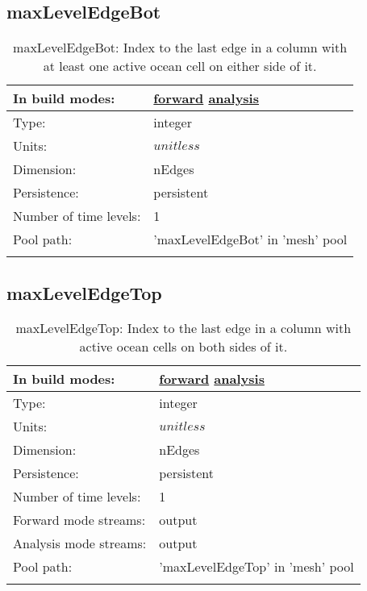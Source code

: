 \subsection[maxLevelEdgeBot]{maxLevelEdgeBot}
\label{subsec:var_sec_mesh_maxLevelEdgeBot}
\begin{center}
\begin{longtable}{| p{2.0in} | p{4.0in} |}
        \hline 
        In build modes: & \hyperref[subsec:forward_var_tab_mesh]{forward} \hyperref[subsec:analysis_var_tab_mesh]{analysis} \\
        \hline 
        Type: & integer \\
        \hline 
        Units: & $unitless$ \\
        \hline 
        Dimension: & nEdges \\
        \hline 
        Persistence: & persistent \\
        \hline 
        Number of time levels: & 1 \\
        \hline 
            Pool path: & 'maxLevelEdgeBot' in 'mesh' pool
 \\
		 \hline 
    \caption{maxLevelEdgeBot: Index to the last edge in a column with at least one active ocean cell on either side of it.}
\end{longtable}
\end{center}
\subsection[maxLevelEdgeTop]{maxLevelEdgeTop}
\label{subsec:var_sec_mesh_maxLevelEdgeTop}
\begin{center}
\begin{longtable}{| p{2.0in} | p{4.0in} |}
        \hline 
        In build modes: & \hyperref[subsec:forward_var_tab_mesh]{forward} \hyperref[subsec:analysis_var_tab_mesh]{analysis} \\
        \hline 
        Type: & integer \\
        \hline 
        Units: & $unitless$ \\
        \hline 
        Dimension: & nEdges \\
        \hline 
        Persistence: & persistent \\
        \hline 
        Number of time levels: & 1 \\
        \hline 
		 Forward mode streams: &  output \\
        \hline 
		 Analysis mode streams: &  output \\
        \hline 
            Pool path: & 'maxLevelEdgeTop' in 'mesh' pool
 \\
		 \hline 
    \caption{maxLevelEdgeTop: Index to the last edge in a column with active ocean cells on both sides of it.}
\end{longtable}
\end{center}
